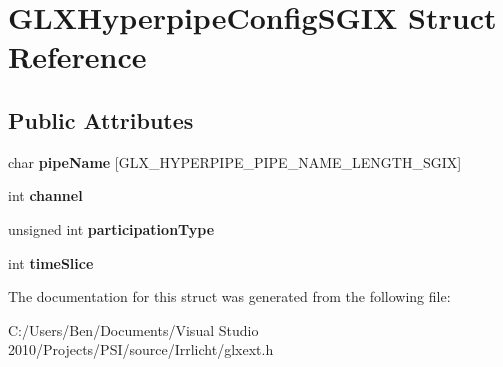 \hypertarget{struct_g_l_x_hyperpipe_config_s_g_i_x}{\section{G\-L\-X\-Hyperpipe\-Config\-S\-G\-I\-X Struct Reference}
\label{struct_g_l_x_hyperpipe_config_s_g_i_x}
}
\subsection*{Public Attributes}
\begin{DoxyCompactItemize}
\item 
\hypertarget{struct_g_l_x_hyperpipe_config_s_g_i_x_a9e3748f92005cac81cb44d4c67acccb8}{char {\bfseries pipe\-Name} \mbox{[}G\-L\-X\-\_\-\-H\-Y\-P\-E\-R\-P\-I\-P\-E\-\_\-\-P\-I\-P\-E\-\_\-\-N\-A\-M\-E\-\_\-\-L\-E\-N\-G\-T\-H\-\_\-\-S\-G\-I\-X\mbox{]}}\label{struct_g_l_x_hyperpipe_config_s_g_i_x_a9e3748f92005cac81cb44d4c67acccb8}

\item 
\hypertarget{struct_g_l_x_hyperpipe_config_s_g_i_x_abc812d8796ba89d5de4e33b3532d8335}{int {\bfseries channel}}\label{struct_g_l_x_hyperpipe_config_s_g_i_x_abc812d8796ba89d5de4e33b3532d8335}

\item 
\hypertarget{struct_g_l_x_hyperpipe_config_s_g_i_x_a093cfaaec305531f66e1120929b5b01b}{unsigned int {\bfseries participation\-Type}}\label{struct_g_l_x_hyperpipe_config_s_g_i_x_a093cfaaec305531f66e1120929b5b01b}

\item 
\hypertarget{struct_g_l_x_hyperpipe_config_s_g_i_x_afe9288e75dc1ae5e0f33eff978d7024d}{int {\bfseries time\-Slice}}\label{struct_g_l_x_hyperpipe_config_s_g_i_x_afe9288e75dc1ae5e0f33eff978d7024d}

\end{DoxyCompactItemize}


The documentation for this struct was generated from the following file\-:\begin{DoxyCompactItemize}
\item 
C\-:/\-Users/\-Ben/\-Documents/\-Visual Studio 2010/\-Projects/\-P\-S\-I/source/\-Irrlicht/glxext.\-h\end{DoxyCompactItemize}
